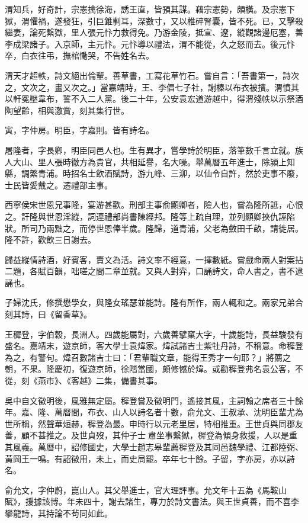 \begin{pinyinscope}
渭知兵，好奇計，宗憲擒徐海，誘王直，皆預其謀。藉宗憲勢，頗橫。及宗憲下獄，渭懼禍，遂發狂，引巨錐剚耳，深數寸，又以椎碎腎囊，皆不死。已，又擊殺繼妻，論死繫獄，里人張元忭力救得免。乃游金陵，抵宣、遼，縱觀諸邊厄塞，善李成梁諸子。入京師，主元忭。元忭導以禮法，渭不能從，久之怒而去。後元忭卒，白衣往弔，撫棺慟哭，不告姓名去。

渭天才超軼，詩文絕出倫輩。善草書，工寫花草竹石。嘗自言：「吾書第一，詩次之，文次之，畫又次之。」當嘉靖時，王、李倡七子社，謝榛以布衣被擯。渭憤其以軒冕壓韋布，誓不入二人黨。後二十年，公安袁宏道游越中，得渭殘帙以示祭酒陶望齡，相與激賞，刻其集行世。

寅，字仲房。明臣，字嘉則。皆有詩名。

屠隆者，字長卿，明臣同邑人也。生有異才，嘗學詩於明臣，落筆數千言立就。族人大山、里人張時徹方為貴官，共相延譽，名大噪。舉萬曆五年進士，除潁上知縣，調繁青浦。時招名士飲酒賦詩，游九峰、三泖，以仙令自許，然於吏事不廢，士民皆愛戴之。遷禮部主事。

西寧侯宋世恩兄事隆，宴游甚歡。刑部主事俞顯卿者，險人也，嘗為隆所詆，心恨之。訐隆與世恩淫縱，詞連禮部尚書陳經邦。隆等上疏自理，並列顯卿挾仇誣陷狀。所司乃兩黜之，而停世恩俸半歲。隆歸，道青浦，父老為斂田千畝，請徙居。隆不許，歡飲三日謝去。

歸益縱情詩酒，好賓客，賣文為活。詩文率不經意，一揮數紙。嘗戲命兩人對案拈二題，各賦百韻，咄嗟之間二章並就。又與人對弈，口誦詩文，命人書之，書不逮誦也。

子婦沈氏，修撰懋學女，與隆女瑤瑟並能詩。隆有所作，兩人輒和之。兩家兄弟合刻其詩，曰《留香草》。

王穉登，字伯穀，長洲人。四歲能屬對，六歲善擘窠大字，十歲能詩，長益駿發有盛名。嘉靖末，遊京師，客大學士袁煒家。煒試諸吉士紫牡丹詩，不稱意。命穉登為之，有警句。煒召數諸吉士曰：「君輩職文章，能得王秀才一句耶？」將薦之朝，不果。隆慶初，復遊京師，徐階當國，頗修憾於煒。或勸穉登弗名袁公客，不從，刻《燕市》、《客越》二集，備書其事。

吳中自文徵明後，風雅無定屬。穉登嘗及徵明門，遙接其風，主詞翰之席者三十餘年。嘉、隆、萬曆間，布衣、山人以詩名者十數，俞允文、王叔承、沈明臣輩尤為世所稱，然聲華烜赫，穉登為最。申時行以元老里居，特相推重。王世貞與同郡友善，顧不甚推之。及世貞歿，其仲子士肅坐事繫獄，穉登為傾身救援，人以是重其風義。萬曆中，詔修國史，大學士趙志皋輩薦穉登及其同邑魏學禮、江都陸弼、黃岡王一鳴。有詔徵用，未上，而史局罷。卒年七十餘。子留，字亦房，亦以詩名。

俞允文，字仲蔚，崑山人。其父舉進士，官大理評事。允文年十五為《馬鞍山賦》，援據該博。年未四十，謝去諸生，專力於詩文書法。與王世貞善，而不喜李攀龍詩，其持論不茍同如此。


\end{pinyinscope}
